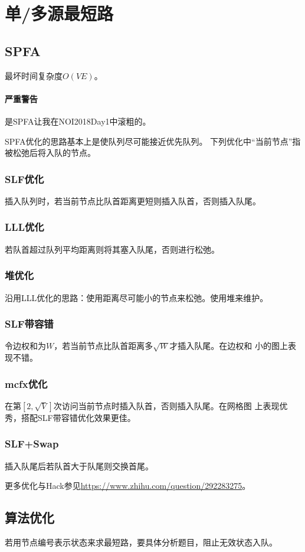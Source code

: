 \section{单/多源最短路}
\subsection{SPFA}
最坏时间复杂度$O(VE)$。
\paragraph{严重警告}
是SPFA让我在NOI2018Day1中滚粗的。

SPFA优化的思路基本上是使队列尽可能接近优先队列。
下列优化中``当前节点''指被松弛后将入队的节点。
\subsubsection{SLF优化}
插入队列时，若当前节点比队首距离更短则插入队首，否则插入队尾。
\subsubsection{LLL优化}
若队首超过队列平均距离则将其塞入队尾，否则进行松弛。
\subsubsection{堆优化}
沿用LLL优化的思路：使用距离尽可能小的节点来松弛。使用堆来维护。
\subsubsection{SLF带容错}
令边权和为$W$，若当前节点比队首距离多$\sqrt{W}$才插入队尾。在边权和
小的图上表现不错。
\subsubsection{mcfx优化}
在第$[2,\sqrt{V}]$次访问当前节点时插入队首，否则插入队尾。在网格图
上表现优秀，搭配SLF带容错优化效果更佳。
\subsubsection{SLF+Swap}
插入队尾后若队首大于队尾则交换首尾。

更多优化与Hack参见\url{https://www.zhihu.com/question/292283275}。
\subsection{算法优化}
若用节点编号表示状态来求最短路，要具体分析题目，阻止无效状态入队。
